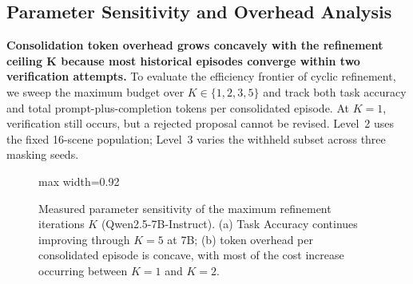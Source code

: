 \documentclass[10pt,a4paper,onecolumn]{article}
\theoremstyle{definition}
\theoremstyle{remark}
\begin{document}
\subsection{Parameter Sensitivity and Overhead Analysis}
\label{sec:exp4}
\textbf{Consolidation token overhead grows concavely with the refinement ceiling $\boldsymbol{K}$ because most historical episodes converge within two verification attempts.} To evaluate the efficiency frontier of cyclic refinement, we sweep the maximum budget over $K\in\{1,2,3,5\}$ and track both task accuracy and total prompt-plus-completion tokens per consolidated episode. At $K=1$, verification still occurs, but a rejected proposal cannot be revised. Level~2 uses the fixed 16-scene population; Level~3 varies the withheld subset across three masking seeds.

\begin{figure}[!t]
    \centering
    \begin{adjustbox}{max width=0.92\linewidth}\hspace{0.4cm}\end{adjustbox}
    \caption{Measured parameter sensitivity of the maximum refinement iterations $K$ (Qwen2.5-7B-Instruct). (a) Task Accuracy continues improving through $K=5$ at 7B; (b) token overhead per consolidated episode is concave, with most of the cost increase occurring between $K=1$ and $K=2$.}
    \label{fig:exp4_sensitivity}
\end{figure}
\end{document}
